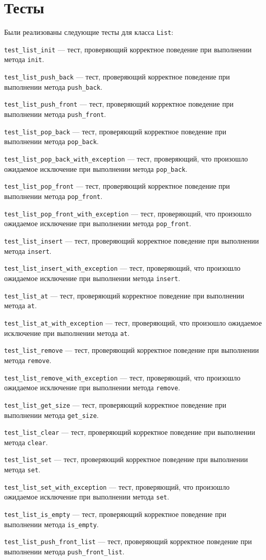 \section*{Тесты}

Были реализованы следующие тесты для класса \verb|List|:

\verb|test_list_init| --- тест, проверяющий корректное поведение при выполнении метода \verb|init|.

\verb|test_list_push_back| --- тест, проверяющий корректное поведение при выполнении метода \verb|push_back|.

\verb|test_list_push_front| --- тест, проверяющий корректное поведение при выполнении метода \verb|push_front|.

\verb|test_list_pop_back| --- тест, проверяющий корректное поведение при выполнении метода \verb|pop_back|.

\verb|test_list_pop_back_with_exception| --- тест, проверяющий, что произошло ожидаемое исключение при выполнении метода \verb|pop_back|.

\verb|test_list_pop_front| --- тест, проверяющий корректное поведение при выполнении метода \verb|pop_front|.

\verb|test_list_pop_front_with_exception| --- тест, проверяющий, что произошло ожидаемое исключение при выполнении метода \verb|pop_front|.

\verb|test_list_insert| --- тест, проверяющий корректное поведение при выполнении метода \verb|insert|.

\verb|test_list_insert_with_exception| --- тест, проверяющий, что произошло ожидаемое исключение при выполнении метода \verb|insert|.

\verb|test_list_at| --- тест, проверяющий корректное поведение при выполнении метода \verb|at|.

\verb|test_list_at_with_exception| --- тест, проверяющий, что произошло ожидаемое исключение при выполнении метода \verb|at|.

\verb|test_list_remove| --- тест, проверяющий корректное поведение при выполнении метода \verb|remove|.

\verb|test_list_remove_with_exception| --- тест, проверяющий, что произошло ожидаемое исключение при выполнении метода \verb|remove|.

\verb|test_list_get_size| --- тест, проверяющий корректное поведение при выполнении метода \verb|get_size|.

\verb|test_list_clear| --- тест, проверяющий корректное поведение при выполнении метода \verb|clear|.

\verb|test_list_set| --- тест, проверяющий корректное поведение при выполнении метода \verb|set|.

\verb|test_list_set_with_exception| --- тест, проверяющий, что произошло ожидаемое исключение при выполнении метода \verb|set|.

\verb|test_list_is_empty| --- тест, проверяющий корректное поведение при выполнении метода \verb|is_empty|.

\verb|test_list_push_front_list| --- тест, проверяющий корректное поведение при выполнении метода \verb|push_front_list|.